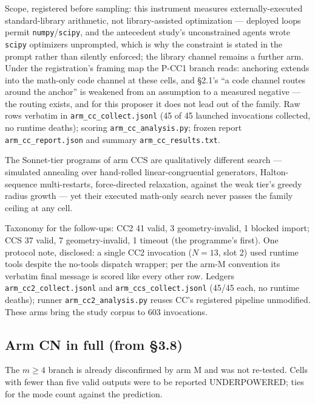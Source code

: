 Scope, registered before sampling: this instrument measures externally-executed
standard-library arithmetic, not library-assisted optimization --- deployed loops permit
\texttt{numpy}/\texttt{scipy}, and the antecedent study's unconstrained agents wrote
\texttt{scipy} optimizers unprompted, which is why the constraint is stated in the prompt
rather than silently enforced; the library channel remains a further arm. Under the
registration's framing map the P-CC1 branch reads: anchoring extends into the math-only code
channel at these cells, and \S2.1's ``a code channel routes around the anchor'' is weakened
from an assumption to a measured negative --- the routing exists, and for this proposer it does
not lead out of the family. Raw rows verbatim in \texttt{arm\_cc\_collect.jsonl} (45 of 45
launched invocations collected, no runtime deaths); scoring \texttt{arm\_cc\_analysis.py};
frozen report \texttt{arm\_cc\_report.json} and summary \texttt{arm\_cc\_results.txt}.

The Sonnet-tier programs of arm CCS are qualitatively different search --- simulated annealing over
hand-rolled linear-congruential generators, Halton-sequence multi-restarts, force-directed
relaxation, against the weak tier's greedy radius growth --- yet their executed math-only search
never passes the family ceiling at any cell.

Taxonomy for the follow-ups: CC2 41 valid, 3 geometry-invalid, 1 blocked import; CCS 37 valid, 7
geometry-invalid, 1 timeout (the programme's first). One protocol note, disclosed: a single CC2
invocation ($N = 13$, slot 2) used runtime tools despite the no-tools dispatch wrapper; per the
arm-M convention its verbatim final message is scored like every other row. Ledgers
\texttt{arm\_cc2\_collect.jsonl} and \texttt{arm\_ccs\_collect.jsonl} (45/45 each, no runtime deaths);
runner \texttt{arm\_cc2\_analysis.py} reuses CC's registered pipeline unmodified. These arms bring
the study corpus to 603 invocations.

\subsection{Arm CN in full (from \S3.8)}

The $m \ge 4$ branch is already disconfirmed by arm M and was not re-tested. Cells with fewer than
five valid outputs were to be reported UNDERPOWERED; ties for the mode count against the
prediction.

